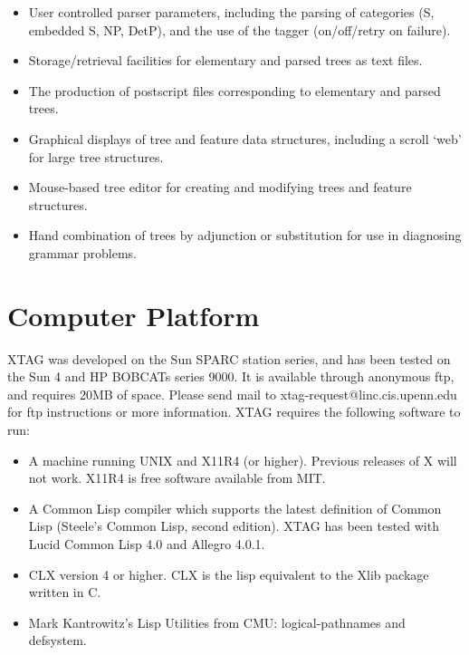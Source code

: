 {\begin{itemize}
\item User controlled parser parameters, including the parsing of
categories (S, embedded S, NP, DetP), and the use of the tagger (on/off/retry
on failure).

\item Storage/retrieval facilities for elementary and parsed trees as
text files.

\item The production of postscript files corresponding to elementary
and parsed trees.

\item Graphical displays of tree and feature data structures,
including a scroll `web' for large tree structures.

\item Mouse-based tree editor for creating and modifying trees and
feature structures.

\item Hand combination of trees by adjunction or substitution for use
in diagnosing grammar problems.

\end{itemize}


\section{Computer Platform}

XTAG was developed on the Sun SPARC station series, and has been tested on the
Sun 4 and HP BOBCATs series 9000.  It is available through anonymous ftp, and
requires 20MB of space.  Please send mail to xtag-request@linc.cis.upenn.edu
for ftp instructions or more information.  XTAG requires the following software
to run:

\begin{itemize}

\item A machine running UNIX and X11R4 (or higher). Previous releases of X will
not work.  X11R4 is free software available from MIT.

\item A Common Lisp compiler which supports the latest definition of Common 
Lisp (Steele's Common Lisp, second edition).  XTAG has been tested with Lucid
Common Lisp 4.0 and Allegro 4.0.1.

\item CLX version 4 or higher. CLX is the lisp equivalent to the Xlib package 
written in C.

\item Mark Kantrowitz's Lisp Utilities from CMU: logical-pathnames and
defsystem.


\end{itemize}}
